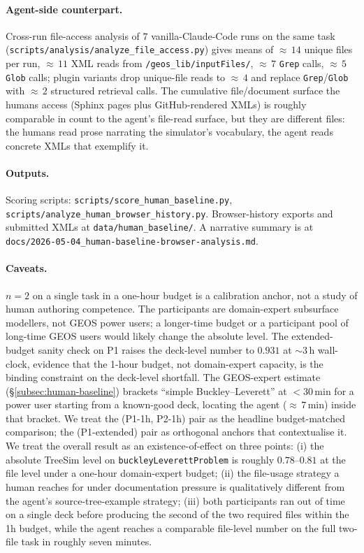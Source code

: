 \documentclass{article}
\begin{document}
\paragraph{Agent-side counterpart.} Cross-run file-access analysis of $7$ vanilla-Claude-Code runs on the same task (\texttt{scripts/analysis/analyze\_file\_access.py}) gives means of ${\approx}\,14$ unique files per run, ${\approx}\,11$ XML reads from \texttt{/geos\_lib/inputFiles/}, ${\approx}\,7$ \texttt{Grep} calls, ${\approx}\,5$ \texttt{Glob} calls; plugin variants drop unique-file reads to ${\approx}\,4$ and replace \texttt{Grep}/\texttt{Glob} with ${\approx}\,2$ structured retrieval calls. The cumulative file/document surface the humans access (Sphinx pages plus GitHub-rendered XMLs) is roughly comparable in count to the agent's file-read surface, but they are different files: the humans read prose narrating the simulator's vocabulary, the agent reads concrete XMLs that exemplify it.

\paragraph{Outputs.} Scoring scripts: \texttt{scripts/score\_human\_baseline.py}, \texttt{scripts/analyze\_human\_browser\_history.py}. Browser-history exports and submitted XMLs at \texttt{data/human\_baseline/}. A narrative summary is at \texttt{docs/2026-05-04\_human-baseline-browser-analysis.md}.

\paragraph{Caveats.} $n=2$ on a single task in a one-hour budget is a calibration anchor, not a study of human authoring competence. The participants are domain-expert subsurface modellers, not GEOS power users; a longer-time budget or a participant pool of long-time GEOS users would likely change the absolute level. The extended-budget sanity check on P1 raises the deck-level number to $0.931$ at $\sim\!3\,$h wall-clock, evidence that the 1-hour budget, not domain-expert capacity, is the binding constraint on the deck-level shortfall. The GEOS-expert estimate (\S\ref{subsec:human-baseline}) brackets ``simple Buckley--Leverett'' at ${<}30\,$min for a power user starting from a known-good deck, locating the agent (${\approx}\,7\,$min) inside that bracket. We treat the (P1-1h, P2-1h) pair as the headline budget-matched comparison; the (P1-extended) pair as orthogonal anchors that contextualise it. We treat the overall result as an existence-of-effect on three points: (i) the absolute TreeSim level on \texttt{buckleyLeverettProblem} is roughly $0.78$--$0.81$ at the file level under a one-hour domain-expert budget; (ii) the file-usage strategy a human reaches for under documentation pressure is qualitatively different from the agent's source-tree-example strategy; (iii) both participants ran out of time on a single deck before producing the second of the two required files within the 1h budget, while the agent reaches a comparable file-level number on the full two-file task in roughly seven minutes.
\end{document}
